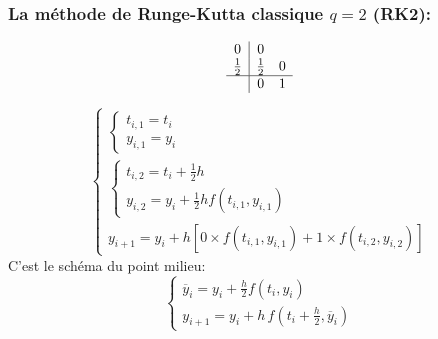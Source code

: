 \documentclass{beamer}
\begin{document}
\begin{frame}
 \frametitle{La méthode de Runge-Kutta classique  $q=2$ (RK2):}

\[\begin{array}{c|cc}
0&0&\\
\frac 12&\frac 12 &0\\
 \hline
&0&1
\end{array}\]

\[\left\{\begin{array}{l}
 \left\{\begin{array}{l}
 t_{i,1}=t_{i}\\
 y_{i,1}=y_{i}
\end{array}\right.\\
\left\{\begin{array}{l}
 t_{i,2}=t_{i}+\frac 12 h\\
 y_{i,2}=y_{i}+\frac 12 hf(t_{i,1},y_{i,1})
\end{array}\right.\\

 y_{i+1}=y_{i}+h\left[0\times  f(t_{i,1},y_{i,1})+1\times f(t_{i,2},y_{i,2})\right]
\end{array}\right.\]
C'est le schéma du point milieu:
\[\left\{\begin{array}{l}
 \overline{y}_{i}=y_{i}+\frac h2 f(t_{i},y_{i})\\
 y_{i+1}=y_{i}+h\,f(t_{i}+\frac h2,\overline{y}_{i})
\end{array}\right.\]
\end{frame}      
    
    
\end{document}
